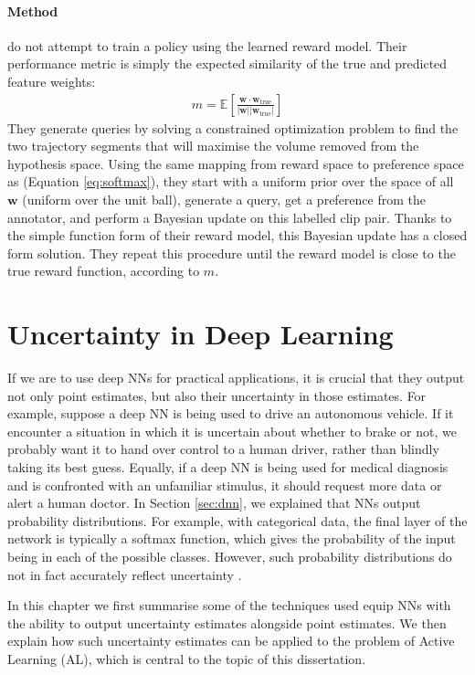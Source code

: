 \documentclass[11pt, a4paper, bibliography=totoc]{report}
\newcommand{\w}{\mathbf{w}}
\begin{document}
\subsubsection{Method}
\cite{Byk2017} do not attempt to train a policy using the learned reward model. Their performance metric is simply the expected similarity of the true and predicted feature weights:
\begin{align*}
m = \mathbb{E}\left[  \frac{\w \cdot \w_\text{true}}{\vert \w \vert \vert \w_\text{true} \vert}  \right]
\end{align*}
They generate queries by solving a constrained optimization problem to find the two trajectory segments that will maximise the volume removed from the hypothesis space. Using the same mapping from reward space to preference space as \cite{Christiano2017} (Equation \ref{eq:softmax}), they start with a uniform prior over the space of all $ \w $ (uniform over the unit ball), generate a query, get a preference from the annotator, and perform a Bayesian update on this labelled clip pair. Thanks to the simple function form of their reward model, this Bayesian update has a closed form solution. They repeat this procedure until the reward model is close to the true reward function, according to $ m $.

\chapter{Uncertainty in Deep Learning}
If we are to use deep NNs for practical applications, it is crucial that they output not only point estimates, but also their uncertainty in those estimates. For example, suppose a deep NN is being used to drive an autonomous vehicle. If it encounter a situation in which it is uncertain about whether to brake or not, we probably want it to hand over control to a human driver, rather than blindly taking its best guess. Equally, if a deep NN is being used for medical diagnosis and is confronted with an unfamiliar stimulus, it should request more data or alert a human doctor. In Section \ref{sec:dnn}, we explained that NNs output probability distributions. For example, with categorical data, the final layer of the network is typically a softmax function, which gives the probability of the input being in each of the possible classes. However, such probability distributions do not in fact accurately reflect uncertainty \cite[p.~13]{Gal2017a}.

In this chapter we first summarise some of the techniques used equip NNs with the ability to output uncertainty estimates alongside point estimates. We then explain how such uncertainty estimates can be applied to the problem of Active Learning (AL), which is central to the topic of this dissertation.
\end{document}
